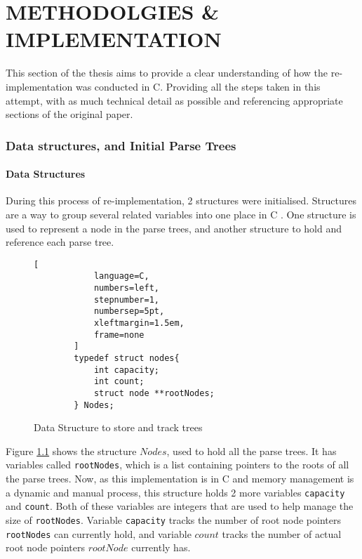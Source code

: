 \chapter{METHODOLGIES \& IMPLEMENTATION}

This section of the thesis aims to provide a clear understanding of how the re-implementation was conducted in C. Providing all the steps taken in this attempt, with as much technical detail as possible and referencing appropriate sections of the original paper.

\subsection{Data structures, and Initial Parse Trees}
\subsubsection{Data Structures}
During this process of re-implementation, 2 structures were initialised. Structures are a way to group several related variables into one place in C \cite{w3schoolStructuresStructs2025}. One structure is used to represent a node in the parse trees, and another structure to hold and reference each parse tree.
\begin{figure}[H]

    \begin{tcolorbox}[title=Nodes Structure for storing trees, colback=white, colframe=black]
        \begin{lstlisting}[
            language=C,
            numbers=left,
            stepnumber=1,
            numbersep=5pt,
            xleftmargin=1.5em,
            frame=none
        ]
        typedef struct nodes{
            int capacity;
            int count;
            struct node **rootNodes;
        } Nodes;
        \end{lstlisting}

    \end{tcolorbox}

\caption{Data Structure to store and track trees}
\label{fig:Data_Structures1}
\end{figure}

Figure \ref{fig:Data_Structures1} shows the structure $Nodes$, used to hold all the parse trees. It has variables called \texttt{rootNodes}, which is a list containing pointers to the roots of all the parse trees. Now, as this implementation is in C and memory management is a dynamic and manual process, this structure holds 2 more variables \texttt{capacity} and \texttt{count}. Both of these variables are integers that are used to help manage the size of \texttt{rootNodes}. Variable \texttt{capacity} tracks the number of root node pointers \texttt{rootNodes} can currently hold, and variable $count$ tracks the number of actual root node pointers $rootNode$ currently has.

